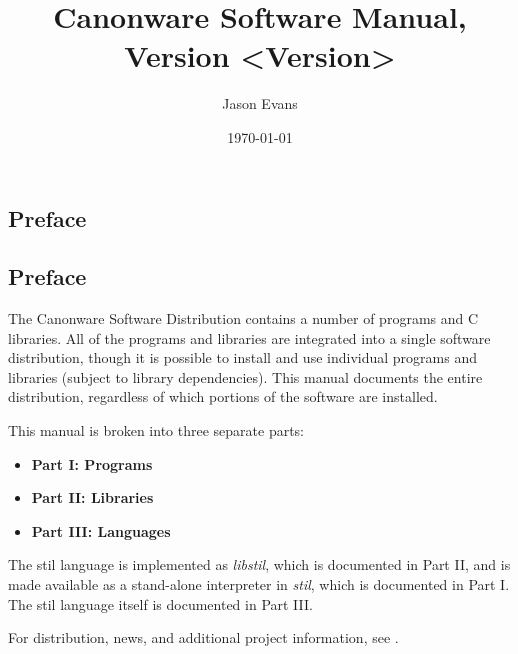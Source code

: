 \documentclass[10pt,titlepage]{book}
\title{Canonware Software Manual, Version <Version>}
\author{Jason Evans}
\date{\today}
\newcommand{\clearemptydoublepage}
	{\newpage \thispagestyle{empty} \cleardoublepage}
\newcommand{\binname}[1]{{\em #1}}
\newcommand{\libname}[1]{{\em #1}}
\begin{document}
\frontmatter
\pagestyle{plain}
\maketitle

\clearemptydoublepage
\begin{htmlonly}
\part*{Preface}
\end{htmlonly}
\begin{latexonly}
\chapter*{Preface}
\end{latexonly}
The Canonware Software Distribution contains a number of programs and C
libraries.  All of the programs and libraries are integrated into a single
software distribution, though it is possible to install and use individual
programs and libraries (subject to library dependencies).  This manual documents
the entire distribution, regardless of which portions of the software are
installed.

This manual is broken into three separate parts:
\begin{itemize}
\item{\bf{Part I}: Programs}
\item{\bf{Part II}: Libraries}
\item{\bf{Part III}: Languages}
\end{itemize}

The stil language is implemented as \libname{libstil}, which is documented in
Part II, and is made available as a stand-alone interpreter in \binname{stil},
which is documented in Part I.  The stil language itself is documented in Part
III.

For distribution, news, and additional project information, see
.

\clearemptydoublepage
\tableofcontents

%
%
\mainmatter

%
%
\renewcommand{\chaptermark}[1]{\markboth{#1}{}}
\renewcommand{\sectionmark}[1]{\markright{\thesection\ #1}}
\lhead[\bfseries\thepage]{\bfseries\rightmark}
\cfoot{}
\setlength{\headrulewidth}{2pt}
\pagestyle{fancy}
\end{document}
